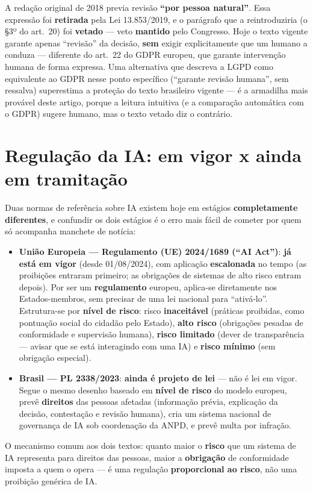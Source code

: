 \begin{cuidado}
A redação original de 2018 previa revisão \textbf{“por pessoa natural”}.
Essa expressão foi \textbf{retirada} pela Lei 13.853/2019, e o parágrafo
que a reintroduziria (o §3º do art.\ 20) foi \textbf{vetado} --- veto
\textbf{mantido} pelo Congresso. Hoje o texto vigente garante apenas
“revisão” da decisão, \textbf{sem} exigir explicitamente que um humano a
conduza --- diferente do art.\ 22 do GDPR europeu, que garante intervenção
humana de forma expressa. Uma alternativa que descreva a LGPD como
equivalente ao GDPR nesse ponto específico (“garante revisão humana”, sem
ressalva) superestima a proteção do texto brasileiro vigente --- é a
armadilha mais provável deste artigo, porque a leitura intuitiva (e a
comparação automática com o GDPR) sugere humano, mas o texto vetado diz o
contrário.
\end{cuidado}

\section{Regulação da IA: em vigor x ainda em tramitação}

\begin{conceito}
Duas normas de referência sobre IA existem hoje em estágios
\textbf{completamente diferentes}, e confundir os dois estágios é o erro
mais fácil de cometer por quem só acompanha manchete de notícia:

\begin{itemize}
\item \textbf{União Europeia --- Regulamento (UE) 2024/1689 (“AI Act”)}:
\textbf{já está em vigor} (desde 01/08/2024), com aplicação
\textbf{escalonada} no tempo (as proibições entraram primeiro; as
obrigações de sistemas de alto risco entram depois). Por ser um
\textbf{regulamento} europeu, aplica-se diretamente nos Estados-membros,
sem precisar de uma lei nacional para “ativá-lo”. Estrutura-se por
\textbf{nível de risco}: risco \textbf{inaceitável} (práticas proibidas,
como pontuação social do cidadão pelo Estado), \textbf{alto risco}
(obrigações pesadas de conformidade e supervisão humana), \textbf{risco
limitado} (dever de transparência --- avisar que se está interagindo com
uma IA) e \textbf{risco mínimo} (sem obrigação especial).
\item \textbf{Brasil --- PL 2338/2023}: \textbf{ainda é projeto de lei}
--- não é lei em vigor. Segue o mesmo desenho baseado em \textbf{nível de
risco} do modelo europeu, prevê \textbf{direitos} das pessoas afetadas
(informação prévia, explicação da decisão, contestação e revisão humana),
cria um sistema nacional de governança de IA sob coordenação da ANPD, e
prevê multa por infração.
\end{itemize}

O mecanismo comum aos dois textos: quanto maior o \textbf{risco} que um
sistema de IA representa para direitos das pessoas, maior a
\textbf{obrigação} de conformidade imposta a quem o opera --- é uma
regulação \textbf{proporcional ao risco}, não uma proibição genérica de
IA.
\end{conceito}

